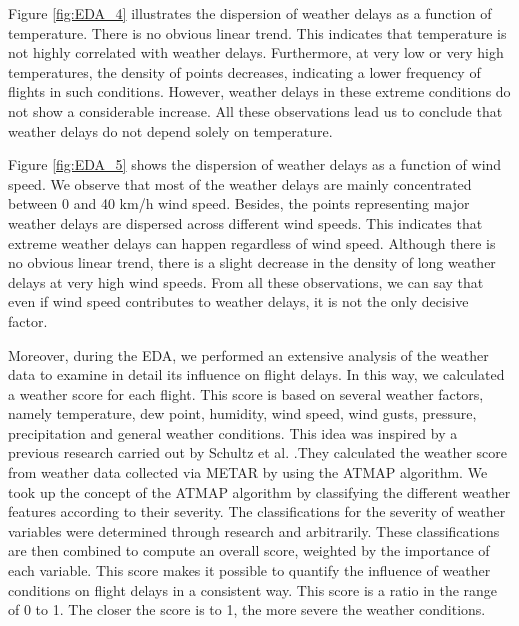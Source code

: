 \documentclass[12pt,oneside]{book} %
\begin{document}
\noindent Figure \ref{fig:EDA_4} illustrates the dispersion of weather delays  as a function of temperature. There is no obvious linear trend. This indicates that temperature is not highly correlated with weather delays. Furthermore, at very low or very high temperatures, the density of points decreases, indicating a lower frequency of flights in such conditions. However, weather delays in these extreme conditions do not show a considerable increase. All these observations lead us to conclude that weather delays do not depend solely on temperature.

\noindent Figure \ref{fig:EDA_5} shows the dispersion of weather delays  as a function of wind speed. We observe that most of the weather delays are mainly concentrated between 0 and 40 km/h wind speed. Besides, the points representing major weather delays are dispersed across different wind speeds. This indicates that extreme weather delays can happen regardless of wind speed. Although there is no obvious linear trend, there is a slight decrease in the density of long weather delays at very high wind speeds. From all these observations, we can say that even if wind speed contributes to weather delays, it is not the only decisive factor.

\noindent Moreover, during the EDA, we performed an extensive analysis of the weather data to examine in detail its influence on flight delays. In this way, we calculated a weather score for each flight. This score is based on several weather factors, namely temperature, dew point, humidity, wind speed, wind gusts, pressure, precipitation and general weather conditions. This idea was inspired by a previous research carried out by Schultz et al. \cite{Schultz2021} .They calculated the weather score from weather data collected via METAR by using the ATMAP algorithm. We took up the concept of the ATMAP algorithm by classifying the different weather features according to their severity. The classifications for the severity of weather variables were determined through research and arbitrarily. These classifications are then combined to compute an overall score, weighted by the importance of each variable. This score makes it possible to quantify the influence of weather conditions on flight delays in a consistent way. This score is a ratio in the range of 0 to 1. The closer the score is to 1, the more severe the weather conditions.
\end{document}
